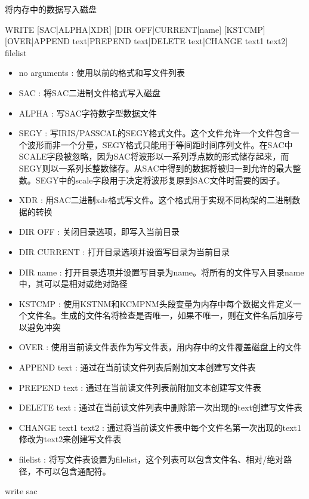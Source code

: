 \label{cmd:write}

将内存中的数据写入磁盘

\begin{SACSTX}
WRITE [SAC|ALPHA|XDR] [DIR OFF|CURRENT|name] [KSTCMP] 
    [OVER|APPEND text|PREPEND text|DELETE text|CHANGE text1 text2] filelist
\end{SACSTX}

\begin{itemize}
\item no arguments : 使用以前的格式和写文件列表 
\item SAC : 将SAC二进制文件格式写入磁盘 
\item ALPHA : 写SAC字符数字型数据文件 
\item SEGY : 写IRIS/PASSCAL的SEGY格式文件。这个文件允许一个文件包含一个波形而非一个分量，SEGY格式只能用于等间距时间序列文件。在SAC中SCALE字段被忽略，因为SAC将波形以一系列浮点数的形式储存起来，而SEGY则以一系列长整数储存。从SAC中得到的数据将被归一到允许的最大整数。SEGY中的scale字段用于决定将波形复原到SAC文件时需要的因子。
\item XDR : 用SAC二进制xdr格式写文件。这个格式用于实现不同构架的二进制数据的转换 
\item DIR OFF : 关闭目录选项，即写入当前目录 
\item DIR CURRENT : 打开目录选项并设置写目录为当前目录 
\item DIR name : 打开目录选项并设置写目录为name。将所有的文件写入目录name中，其可以是相对或绝对路径 
\item KSTCMP : 使用KSTNM和KCMPNM头段变量为内存中每个数据文件定义一个文件名。生成的文件名将检查是否唯一，如果不唯一，则在文件名后加序号以避免冲突
\item OVER : 使用当前读文件表作为写文件表，用内存中的文件覆盖磁盘上的文件 
\item APPEND text : 通过在当前读文件列表后附加文本创建写文件表 
\item PREPEND text : 通过在当前读文件列表前附加文本创建写文件表 
\item DELETE text :  通过在当前读文件列表中删除第一次出现的text创建写文件表 
\item CHANGE text1 text2 : 通过将当前读文件表中每个文件名第一次出现的text1修改为text2来创建写文件表 
\item filelist : 将写文件表设置为filelist，这个列表可以包含文件名、相对/绝对路径，不可以包含通配符。 
\end{itemize}

\begin{SACDFT}
write sac
\end{SACDFT}


